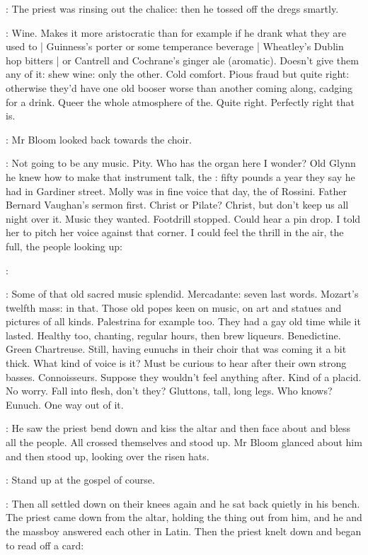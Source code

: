 :
The priest was rinsing out the chalice:
then he tossed off the dregs smartly.

\BloomInt:
Wine.
Makes it more aristocratic than
for example if he drank
what they are used to |
Guinness's porter or some temperance beverage |
Wheatley's Dublin hop bitters |
or Cantrell and Cochrane's ginger ale (aromatic).
Doesn't give them any of it:
shew wine:
only the other.
Cold comfort.
Pious fraud but quite right:
otherwise they'd have one old booser worse than another coming along,
cadging for a drink.
Queer the whole atmosphere of the.
Quite right.
Perfectly right that is.

:
Mr Bloom looked back towards the choir.

\BloomInt:
Not going to be any music.
Pity.
Who has the organ here I wonder?
Old Glynn he knew how to make that instrument talk,
the :
fifty pounds a year they say he had in Gardiner street.
Molly was in fine voice that day,
the  of Rossini.
Father Bernard Vaughan's sermon first.
Christ or Pilate?
Christ,
but don't keep us all night over it.
Music they wanted.
Footdrill stopped.
Could hear a pin drop.
I told her to pitch her voice against that corner.
I could feel the thrill in the air,
the full,
the people looking up:

\priest:

\BloomInt:
Some of that old sacred music splendid.
Mercadante: seven last words.
Mozart's twelfth mass:
 in that.
Those old popes keen on music,
on art and statues and pictures of all kinds.
Palestrina for example too.
They had a gay old time while it lasted.
Healthy too,
chanting,
regular hours,
then brew liqueurs.
Benedictine.
Green Chartreuse.
Still, having eunuchs in their choir
that was coming it a bit thick.
What kind of voice is it?
Must be curious to hear after their own strong basses.
Connoisseurs.
Suppose they wouldn't feel anything after.
Kind of a placid.
No worry.
Fall into flesh, don't they?
Gluttons, tall, long legs.
Who knows?
Eunuch.
One way out of it.

:
He saw the priest bend down and kiss the altar
and then face about and bless all the people.
All crossed themselves and stood up.
Mr Bloom glanced about him
and then stood up,
looking over the risen hats.

\BloomInt:
Stand up at the gospel of course.

:
Then all settled down on their knees again
and he sat back quietly in his bench.
The priest came down from the altar,
holding the thing out from him,
and he and the massboy answered each other in Latin.
Then the priest knelt down and began to read off a card:

